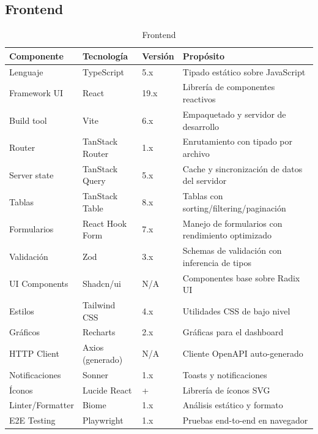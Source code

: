 \subsection{Frontend}\label{frontend}

\begin{longtable}[]{@{}
  >{\raggedright\arraybackslash}p{}
  >{\raggedright\arraybackslash}p{}
  >{\raggedright\arraybackslash}p{}
  >{\raggedright\arraybackslash}p{}@{}}
\caption[Frontend]{Frontend}\tabularnewline
\toprule\noalign{}
\begin{minipage}[b]{\linewidth}\raggedright
Componente
\end{minipage} & \begin{minipage}[b]{\linewidth}\raggedright
Tecnología
\end{minipage} & \begin{minipage}[b]{\linewidth}\raggedright
Versión
\end{minipage} & \begin{minipage}[b]{\linewidth}\raggedright
Propósito
\end{minipage} \\
\midrule\noalign{}
\endhead
\bottomrule\noalign{}
\endlastfoot
Lenguaje & TypeScript & 5.x & Tipado estático sobre JavaScript \\
Framework UI & React & 19.x & Librería de componentes reactivos \\
Build tool & Vite & 6.x & Empaquetado y servidor de desarrollo \\
Router & TanStack Router & 1.x & Enrutamiento con tipado por archivo \\
Server state & TanStack Query & 5.x & Cache y sincronización de datos del servidor \\
Tablas & TanStack Table & 8.x & Tablas con sorting/filtering/paginación \\
Formularios & React Hook Form & 7.x & Manejo de formularios con rendimiento optimizado \\
Validación & Zod & 3.x & Schemas de validación con inferencia de tipos \\
UI Components & Shadcn/ui & N/A & Componentes base sobre Radix UI \\
Estilos & Tailwind CSS & 4.x & Utilidades CSS de bajo nivel \\
Gráficos & Recharts & 2.x & Gráficas para el dashboard \\
HTTP Client & Axios (generado) & N/A & Cliente OpenAPI auto-generado \\
Notificaciones & Sonner & 1.x & Toasts y notificaciones \\
Íconos & Lucide React & 0.4+ & Librería de íconos SVG \\
Linter/Formatter & Biome & 1.x & Análisis estático y formato \\
E2E Testing & Playwright & 1.x & Pruebas end-to-end en navegador \\
\end{longtable}

